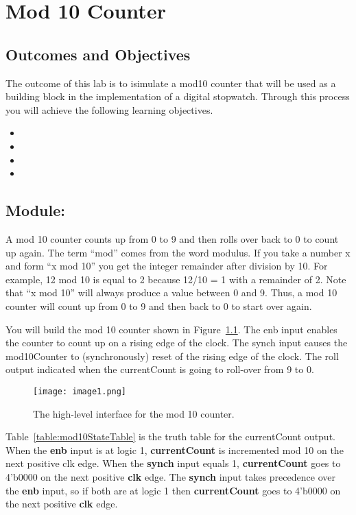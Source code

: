 \chapter{Mod 10 Counter}
\label{chapter:mod10}
\graphicspath{ {./Lab08Mod10Counter/Fig} }


\section{Outcomes and Objectives}

The outcome of this lab is to isimulate a mod10 counter
that will be used as a building block in the implementation 
of a digital stopwatch.
Through this process you will achieve the following
learning objectives.
\begin{itemize}
	\item {}
	\item {}
	\item {}
	\item {}
\end{itemize}



\section{Module: }

A mod 10 counter counts up from 0 to 9 and then rolls over back to 0 to
count up again. The term ``mod'' comes from the word modulus. If you
take a number x and form ``x mod 10'' you get the integer remainder
after division by 10. For example, 12 mod 10 is equal to 2 because 12/10
= 1 with a remainder of 2. Note that ``x mod 10'' will always produce a
value between 0 and 9. Thus, a mod 10 counter will count up from 0 to 9
and then back to 0 to start over again.

You will build the mod 10 counter shown in Figure~\ref{fig:mod10Symbol}. The enb input
enables the counter to count up on a rising edge of the clock. The synch
input causes the mod10Counter to (synchronously) reset of the rising
edge of the clock. The roll output indicated when the currentCount is
going to roll-over from 9 to 0.

\begin{figure}[ht]
\texttt{[image: image1.png]}
\caption{The high-level interface for the mod 10 counter.}
\label{fig:mod10Symbol}
\end{figure}

Table~\ref{table:mod10StateTable} is the truth table for the currentCount output. When the
\textbf{enb} input is at logic 1, \textbf{currentCount} is incremented
mod 10 on the next positive clk edge. When the \textbf{synch} input
equals 1, \textbf{currentCount} goes to 4'b0000 on the next positive
\textbf{clk} edge. The \textbf{synch} input takes precedence over the
\textbf{enb} input, so if both are at logic 1 then \textbf{currentCount}
goes to 4'b0000 on the next positive \textbf{clk} edge.

